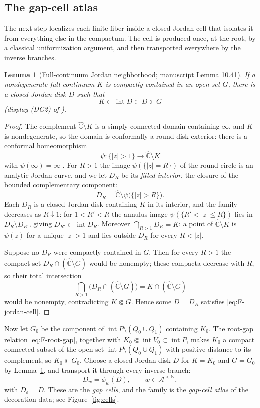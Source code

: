 \documentclass[11pt,reqno]{amsart}
\newtheorem{lemma}[theorem]{Lemma}
\theoremstyle{definition}
\theoremstyle{remark}
\newcommand{\Chat}{\widehat{\mathbb C}}
\newcommand{\Int}{\operatorname{int}}
\begin{document}
\subsection{The gap-cell atlas}\label{subsec:F-atlas}

The next step localizes each finite fiber inside a closed Jordan cell
that isolates it from everything else in the compactum.  The cell is
produced once, at the root, by a classical uniformization argument, and
then transported everywhere by the inverse branches.

\begin{lemma}[Full-continuum Jordan neighborhood; manuscript
Lemma 10.41]\label{lem:jordan-nbhd}
If a nondegenerate full continuum $K$ is compactly contained in an open
set $G$, there is a closed Jordan disk $D$ such that
\begin{equation}\label{eq:F-jordan-cell}
K\subset\Int D\subset D\Subset G
\end{equation}
(display (DG2) of \cite{MWman}).
\end{lemma}

\begin{proof}
The complement $\Chat\setminus K$ is a simply connected domain containing
$\infty$, and $K$ is nondegenerate, so the domain is conformally a
round-disk exterior: there is a conformal homeomorphism
\[
\psi\colon\{|z|>1\}\longrightarrow\Chat\setminus K
\]
with $\psi(\infty)=\infty$ \cite{Pom92}.  For $R>1$ the image
$\psi(\{|z|=R\})$ of the round circle is an analytic Jordan curve, and we
let $D_R$ be its \emph{filled interior}, the closure of the bounded
complementary component:
\[
D_R=\Chat\setminus\psi\bigl(\{|z|>R\}\bigr).
\]
Each $D_R$ is a closed Jordan disk containing $K$ in its interior, and
the family decreases as $R\downarrow1$: for $1<R'<R$ the annulus image
$\psi(\{R'<|z|\le R\})$ lies in $D_{R}\setminus D_{R'}$, giving
$D_{R'}\subset\Int D_R$.  Moreover $\bigcap_{R>1}D_R=K$: a point of
$\Chat\setminus K$ is $\psi(z)$ for a unique $|z|>1$ and lies outside
$D_R$ for every $R<|z|$.

Suppose no $D_R$ were compactly contained in $G$.  Then for every $R>1$
the compact set $D_R\cap(\Chat\setminus G)$ would be nonempty; these
compacta decrease with $R$, so their total intersection
\[
\bigcap_{R>1}\bigl(D_R\cap(\Chat\setminus G)\bigr)
=K\cap(\Chat\setminus G)
\]
would be nonempty, contradicting $K\Subset G$.  Hence some $D=D_R$
satisfies \eqref{eq:F-jordan-cell}.
\end{proof}

Now let $G_0$ be the component of $\Int P\setminus(Q_0\cup Q_1)$
containing $K_0$.  The root-gap relation \eqref{eq:F-root-gap}, together
with $K_0\Subset\Int V_0\subset\Int P$, makes $K_0$ a compact connected
subset of the open set $\Int P\setminus(Q_0\cup Q_1)$ with positive
distance to its complement, so $K_0\Subset G_0$.  Choose a closed Jordan
disk $D$ for $K=K_0$ and $G=G_0$ by Lemma~\ref{lem:jordan-nbhd}, and
transport it through every inverse branch:
\[
D_w=\phi_w(D),\qquad w\in\mathcal A^{<\mathbb N},
\]
with $D_\varepsilon=D$.  These are the \emph{gap cells}, and the family
is the \emph{gap-cell atlas} of the decoration data; see
Figure~\ref{fig:cells}.
\end{document}
